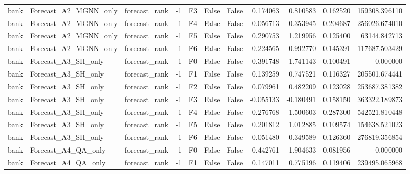 \begin{tabular}{lllrlllrrrr}
      bank &        Forecast\_A2\_MGNN\_only & forecast\_rank &    -1 &  F3 &           False &            False &  0.174063 &  0.810583 & 0.162520 &    159308.396110 \\
      bank &        Forecast\_A2\_MGNN\_only & forecast\_rank &    -1 &  F4 &           False &            False &  0.056713 &  0.353945 & 0.204687 &    256026.674010 \\
      bank &        Forecast\_A2\_MGNN\_only & forecast\_rank &    -1 &  F5 &           False &            False &  0.290753 &  1.219956 & 0.125400 &     63144.842713 \\
      bank &        Forecast\_A2\_MGNN\_only & forecast\_rank &    -1 &  F6 &           False &            False &  0.224565 &  0.992770 & 0.145391 &    117687.503429 \\
      bank &          Forecast\_A3\_SH\_only & forecast\_rank &    -1 &  F0 &           False &            False &  0.391748 &  1.741143 & 0.100491 &         0.000000 \\
      bank &          Forecast\_A3\_SH\_only & forecast\_rank &    -1 &  F1 &           False &            False &  0.139259 &  0.747521 & 0.116327 &    205501.674441 \\
      bank &          Forecast\_A3\_SH\_only & forecast\_rank &    -1 &  F2 &           False &            False &  0.079961 &  0.482209 & 0.123028 &    253687.381382 \\
      bank &          Forecast\_A3\_SH\_only & forecast\_rank &    -1 &  F3 &           False &            False & -0.055133 & -0.180491 & 0.158150 &    363322.189873 \\
      bank &          Forecast\_A3\_SH\_only & forecast\_rank &    -1 &  F4 &           False &            False & -0.276768 & -1.500603 & 0.287300 &    542521.810448 \\
      bank &          Forecast\_A3\_SH\_only & forecast\_rank &    -1 &  F5 &           False &            False &  0.201812 &  1.012885 & 0.109574 &    154638.521023 \\
      bank &          Forecast\_A3\_SH\_only & forecast\_rank &    -1 &  F6 &           False &            False &  0.051480 &  0.349589 & 0.126360 &    276819.356854 \\
      bank &          Forecast\_A4\_QA\_only & forecast\_rank &    -1 &  F0 &           False &            False &  0.442761 &  1.904633 & 0.081956 &         0.000000 \\
      bank &          Forecast\_A4\_QA\_only & forecast\_rank &    -1 &  F1 &           False &            False &  0.147011 &  0.775196 & 0.119406 &    239495.065968 \\

\end{tabular}
